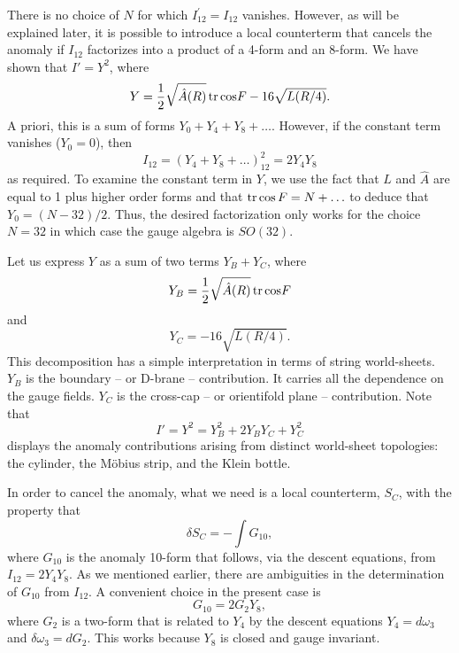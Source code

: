 \documentclass[a4paper,12pt]{article}
\begin{document}
There is no choice of $N$ for which $I_{12}^{\prime} = I_{12}$
vanishes. However, as will be explained later, it is possible to
introduce a local counterterm that cancels the anomaly if $I_{12}$
factorizes into a product of a 4-form and an 8-form. We have shown
that $I' = Y^2$, where
\begin{equation}
Y =  {1 \over 2}\sqrt{\hat A (R)} \, {\rm tr} \, {\rm cos} F - 16
\sqrt{ L(R/4)} .
\end{equation}
A priori, this is a sum of forms $Y_0 + Y_4 + Y_8 + \ldots$.
However, if the constant term vanishes ($Y_0 = 0$), then
\begin{equation}
I_{12} = \left(Y_4 + Y_8 + \ldots \right)_{12}^2 = 2 Y_4 Y_8
\end{equation}
as required. To examine the constant term in $Y$, we use the fact
that $L$ and $\hat A$ are equal to 1 plus higher order forms and
that ${\rm tr} \, {\rm cos}\, F = N + \ldots$ to deduce that $Y_0
= (N - 32 )/2$. Thus, the desired factorization only works for the
choice $N = 32$ in which case the gauge algebra is $SO(32)$.

Let us express $Y$ as a sum of two terms $Y_B + Y_C$, where
\begin{equation}
Y_B =  {1 \over 2}\sqrt{\hat A (R)} \, {\rm tr} \, {\rm cos} F
\end{equation}
and
\begin{equation}
Y_C =  - 16 \sqrt{ L(R/4)} .
\end{equation}
This decomposition has a simple interpretation in terms of string
world-sheets. $Y_B$ is the boundary -- or D-brane -- contribution.
It carries all the dependence on the gauge fields. $Y_C$ is the
cross-cap -- or orientifold plane -- contribution. Note that
\begin{equation}
I' = Y^2 = Y_B^2 + 2Y_B Y_C + Y_C^2
\end{equation}
displays the anomaly contributions arising from distinct
world-sheet topologies: the cylinder, the M\"obius strip, and the
Klein bottle.

In order to cancel the anomaly, what we need is a local
counterterm, $S_{C}$, with the property that
\begin{equation} \label{varycounter}
\delta S_{C} = - \int G_{10},
\end{equation}
where $G_{10}$ is the anomaly  10-form that follows, via the
descent equations, from $I_{12} = 2 Y_4 Y_8$. As we mentioned
earlier, there are ambiguities in the determination of $G_{10}$
from $I_{12}$. A convenient choice in the present case is 
\begin{equation}
G_{10} =  2 G_2 Y_8,
\end{equation} 
where $G_2$ is a two-form that is related to $Y_4$ by
the descent equations $Y_4 = d \omega_3$ and $\delta \omega_3 = d G_2$. 
This works because $Y_8$ is closed and
gauge invariant.
\end{document}
